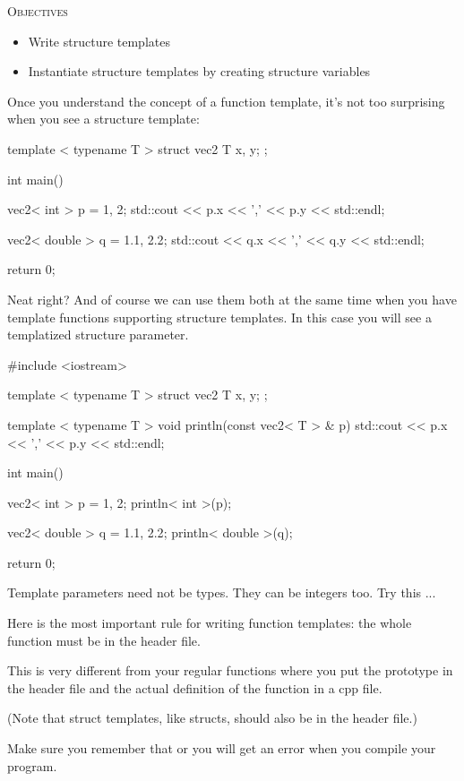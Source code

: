 \newpage{}

\textsc{Objectives}
\begin{itemize}
\item Write structure templates
\item Instantiate structure templates by creating structure variables
\end{itemize}


\newpage{}

Once you understand the concept of a function template,
it's not too surprising when you see a structure
template:

\begin{consolethree}[escapeinside=||]
template < typename T >
struct vec2
{
    T x, y;
};

int main()
{
    vec2< int > p = {1, 2};
    std::cout << p.x << ',' << p.y << std::endl;

    vec2< double > q = {1.1, 2.2};
    std::cout << q.x << ',' << q.y << std::endl;

    return 0;
}
\end{consolethree}

Neat right? And of course we can use them both at the same time when you
have template functions supporting structure templates. In this case you
will see a templatized structure parameter.

\begin{consolethree}[escapeinside=||]
#include <iostream>

template < typename T >
struct vec2
{
    T x, y;
};

template < typename T >
void println(const vec2< T > & p)
{
    std::cout << p.x << ',' << p.y << std::endl;
}

int main()
{
    vec2< int > p = {1, 2};
    println< int >(p);

    vec2< double > q = {1.1, 2.2};
    println< double >(q);

    return 0;
}
\end{consolethree}



Template parameters need not be types. They can be integers too. Try
this ...



\newpage{}

Here is the most important rule for writing function templates: the
whole function must be in the header file.

This is very different from your regular functions where you put the
prototype in the header file and the actual definition of the function
in a cpp file.

(Note that struct templates, like structs, should also be in the header
file.)

Make sure you remember that or you will get an error when you compile
your program.

